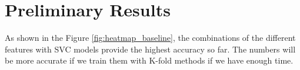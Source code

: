 \section{Preliminary Results}

\begin{figure*}[ht]
    
    \caption{}
    \label{fig:heatmap_baseline}
\end{figure*}

\kant[1-10]     %

As shown in the Figure \ref{fig:heatmap_baseline}, the combinations of the different features with SVC models provide the highest accuracy so far. The numbers will be more accurate if we train them with K-fold methods if we have enough time.
